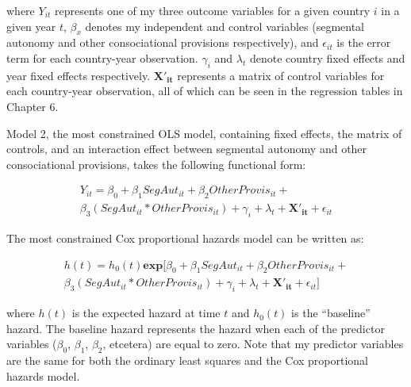 \documentclass[12pt]{article}
\begin{document}
where $Y_{it}$ represents one of my three outcome variables for a given country $i$ in a given year $t$, $\beta_x$ denotes my independent and control variables (segmental autonomy and other consociational provisions respectively), and $\epsilon_{it}$ is the error term for each country-year observation. $\gamma_i$ and $\lambda_t$ denote country fixed effects and year fixed effects respectively. $\mathbf{X'_{it}}$ represents a matrix of control variables for each country-year observation, all of which can be seen in the regression tables in Chapter 6. 

Model 2, the most constrained OLS model, containing fixed effects, the matrix of controls, and an interaction effect between segmental autonomy and other consociational provisions, takes the following functional form: 

\begin{equation}
\begin{gathered}
Y_{it} = \beta_0 + \beta_1 SegAut_{it} + \beta_2 OtherProvis_{it} + \\ \beta_3 (SegAut_{it} * OtherProvis_{it})  + \gamma_i + \lambda_t + \mathbf{X'_{it}} + \epsilon_{it}
\end{gathered}
\end{equation}

The most constrained Cox proportional hazards model can be written as: 

\begin{equation}
\begin{gathered}
h(t) = h_0 (t)\mathbf{exp}[\beta_0 + \beta_1 SegAut_{it} + \beta_2 OtherProvis_{it} + \\ \beta_3 (SegAut_{it} * OtherProvis_{it})  + \gamma_i + \lambda_t + \mathbf{X'_{it}} + \epsilon_{it}]
\end{gathered}
\end{equation}

where $h(t)$ is the expected hazard at time $t$ and $h_0 (t)$ is the ``baseline'' hazard. The baseline hazard represents the hazard when each of the predictor variables ($\beta_0$, $\beta_1$, $\beta_2$, etcetera) are equal to zero. Note that my predictor variables are the same for both the ordinary least squares and the Cox proportional hazards model. 
\end{document}
